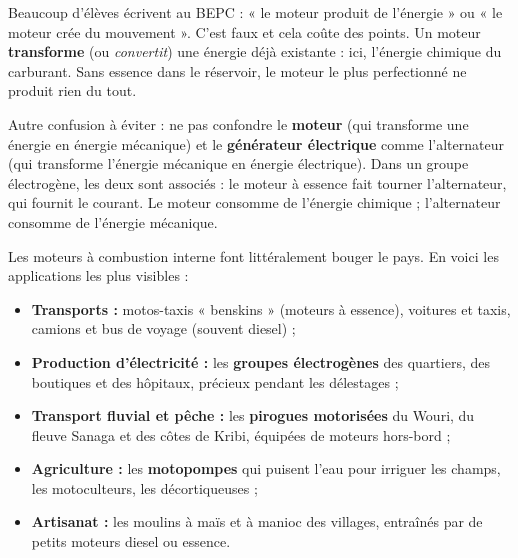 \documentclass[11pt]{article}
\newcounter{popsec}
\newcounter{popsub}
\newcommand{\courssub}[1]{%
  \stepcounter{popsub}%
  \par\vspace{9pt}\noindent{\popxbold\fontsize{11.5}{13}\selectfont\color{popink}{\color{poporange}\thepopsec.\thepopsub}\hspace{6pt}#1}\par\nopagebreak\vspace{4pt}
}
\begin{document}
\begin{attention}
Beaucoup d'élèves écrivent au BEPC : « le moteur produit de l'énergie » ou « le moteur crée du mouvement ». C'est faux et cela coûte des points. Un moteur \textbf{transforme} (ou \emph{convertit}) une énergie déjà existante : ici, l'énergie chimique du carburant. Sans essence dans le réservoir, le moteur le plus perfectionné ne produit rien du tout.

Autre confusion à éviter : ne pas confondre le \textbf{moteur} (qui transforme une énergie en énergie mécanique) et le \textbf{générateur électrique} comme l'alternateur (qui transforme l'énergie mécanique en énergie électrique). Dans un groupe électrogène, les deux sont associés : le moteur à essence fait tourner l'alternateur, qui fournit le courant. Le moteur consomme de l'énergie chimique ; l'alternateur consomme de l'énergie mécanique.
\end{attention}

\courssub{Exemples d'usage au Cameroun}

Les moteurs à combustion interne font littéralement bouger le pays. En voici les applications les plus visibles :

\begin{itemize}
\item \textbf{Transports :} motos-taxis « benskins » (moteurs à essence), voitures et taxis, camions et bus de voyage (souvent diesel) ;
\item \textbf{Production d'électricité :} les \textbf{groupes électrogènes} des quartiers, des boutiques et des hôpitaux, précieux pendant les délestages ;
\item \textbf{Transport fluvial et pêche :} les \textbf{pirogues motorisées} du Wouri, du fleuve Sanaga et des côtes de Kribi, équipées de moteurs hors-bord ;
\item \textbf{Agriculture :} les \textbf{motopompes} qui puisent l'eau pour irriguer les champs, les motoculteurs, les décortiqueuses ;
\item \textbf{Artisanat :} les moulins à maïs et à manioc des villages, entraînés par de petits moteurs diesel ou essence.
\end{itemize}
\end{document}
